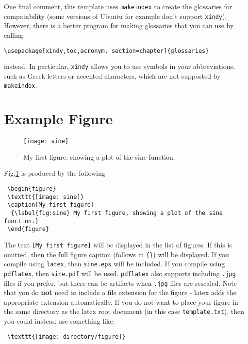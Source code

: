 One final comment, this template uses \verb#makeindex# to create the glossaries
for compatability (some versions of Ubuntu for example don't support \verb#xindy#).
However, there is a better program for making glossaries that you can use by calling
\begin{verbatim}
\usepackage[xindy,toc,acronym, section=chapter]{glossaries}
\end{verbatim}
instead.  In particular, \verb#xindy# allows you to use symbols in your abbreviations,
such as Greek letters or accented characters, which are not supported by \verb#makeindex#.


\section{Example Figure}
 \begin{figure}
 \centering

 \texttt{[image: sine]}

 \caption[My first figure]%
  {\label{fig:sine} My first figure, showing a plot of the sine function.}
 \vspace{0.5 in}
 \end{figure}
Fig.\ref{fig:sine} is produced by the following
\begin{verbatim}
 \begin{figure}
 \texttt{[image: sine]}
 \caption[My first figure] 
  {\label{fig:sine} My first figure, showing a plot of the sine function.}
 \end{figure}
\end{verbatim}
The text \verb#[My first figure]# will be displayed in the list of figures.
If this is omitted, then the full figure caption (follows in \verb#{}#) 
will be displayed.  If you compile using \verb#latex#, then \verb#sine.eps# will be included.
If you compile using \verb#pdflatex#, then \verb#sine.pdf# will be used.  \verb#pdflatex#
also supports including \verb#.jpg# files if you prefer, but there can be artifacts when 
\verb#.jpg# files are rescaled.  Note that you do \textbf{not} need to include a file extension 
for the figure - latex adds the appropriate extension automatically.  If you do
not want to place your figure in the same directory as the latex root document 
(in this case \verb#template.txt#), then you could instead use something like:
\begin{verbatim}
 \texttt{[image: directory/figure]}
\end{verbatim}

